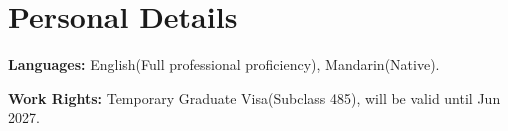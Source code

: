 \documentclass[letterpaper,11pt]{article}
\newcommand{\resumeSubHeadingListStart}{\begin{itemize}[leftmargin=0.15in, label={}]}
\newcommand{\resumeSubHeadingListEnd}{\end{itemize}}
\begin{document}
\section{Personal Details}
  \vspace{2pt}
  \resumeSubHeadingListStart
    \small{\item{
        
        \textbf{Languages:}{ English(Full professional proficiency), Mandarin(Native).} \\ \vspace{3pt}
        
        \textbf{Work Rights:}{ Temporary Graduate Visa(Subclass 485), will be valid until Jun 2027.} \\ \vspace{3pt}
        
    }}
  \resumeSubHeadingListEnd






\end{document}
